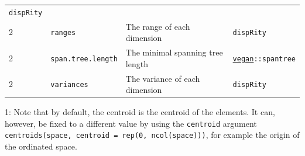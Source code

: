 \documentclass[
]{book}
\begin{document}
\begin{longtable}[]{@{}llll@{}}
\begin{minipage}[t]{0.10\columnwidth}
\texttt{dispRity}\strut
\end{minipage}\tabularnewline
\begin{minipage}[t]{0.07\columnwidth}\raggedright
2\strut
\end{minipage} & \begin{minipage}[t]{0.07\columnwidth}\raggedright
\texttt{ranges}\strut
\end{minipage} & \begin{minipage}[t]{0.64\columnwidth}\raggedright
The range of each dimension\strut
\end{minipage} & \begin{minipage}[t]{0.10\columnwidth}\raggedright
\texttt{dispRity}\strut
\end{minipage}\tabularnewline
\begin{minipage}[t]{0.07\columnwidth}\raggedright
2\strut
\end{minipage} & \begin{minipage}[t]{0.07\columnwidth}\raggedright
\texttt{span.tree.length}\strut
\end{minipage} & \begin{minipage}[t]{0.64\columnwidth}\raggedright
The minimal spanning tree length\strut
\end{minipage} & \begin{minipage}[t]{0.10\columnwidth}\raggedright
\href{https://cran.r-project.org/web/packages/vegan/index.html}{\texttt{vegan}}\texttt{::spantree}\strut
\end{minipage}\tabularnewline
\begin{minipage}[t]{0.07\columnwidth}\raggedright
2\strut
\end{minipage} & \begin{minipage}[t]{0.07\columnwidth}\raggedright
\texttt{variances}\strut
\end{minipage} & \begin{minipage}[t]{0.64\columnwidth}\raggedright
The variance of each dimension\strut
\end{minipage} & \begin{minipage}[t]{0.10\columnwidth}\raggedright
\texttt{dispRity}\strut
\end{minipage}\tabularnewline
\bottomrule
\end{longtable}

1: Note that by default, the centroid is the centroid of the elements.
It can, however, be fixed to a different value by using the \texttt{centroid} argument \texttt{centroids(space,\ centroid\ =\ rep(0,\ ncol(space)))}, for example the origin of the ordinated space.
\end{document}
